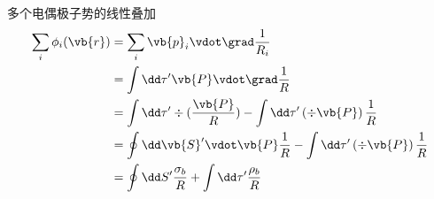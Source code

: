 多个电偶极子势的线性叠加
\begin{equation*}
	\begin{aligned}
	  \sum_i \phi_i(\vb{r}) &=
	\sum_i {\vb{p}_i \vdot }{\grad \frac{1}{R_i}} \\
  &=
	 \int \dd \tau' \vb{P}  \vdot \grad \frac{1}{R} \\
  &=
	 \int \dd \tau'\div (  \frac{\vb{P}}{R}) -
	 \int \dd \tau'\left(\div \vb{P} \right)   \frac{1}{R} \\
  &=
	 \oint \dd \vb{S}' \vdot\vb{P} \frac{1}{R} -
	 \int \dd \tau'\left(\div \vb{P} \right)   \frac{1}{R} \\
  &=
	 \oint \dd S'  \frac{\sigma_b}{R} +
	 \int \dd \tau'  \frac{\rho_b}{R} \\
	\end{aligned}
\end{equation*}


